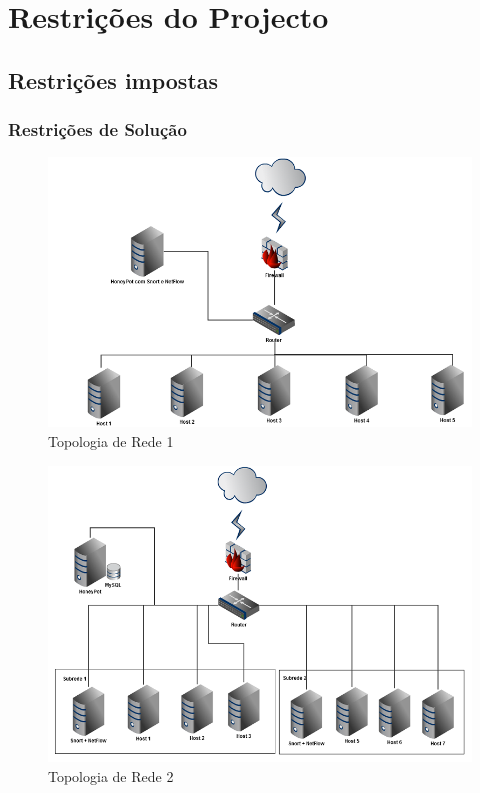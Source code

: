 \chapter{Restrições do Projecto}
\minitoc
\section{Restrições impostas}
\subsection{Restrições de Solução}

\begin{figure}
	\centering	
	\includegraphics[scale=0.7]{images/topologia1.png}
	\caption{Topologia de Rede 1}
\end{figure}

\begin{figure}
	\centering	
	\includegraphics[scale=0.7]{images/topologia3.png}
	\caption{Topologia de Rede 2}
\end{figure}


